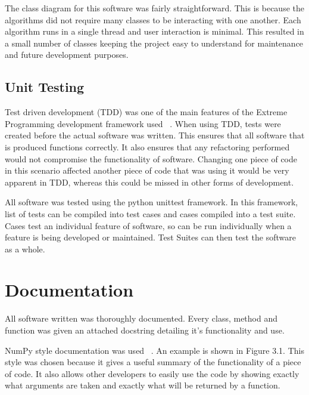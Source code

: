 \documentclass{UoYCSproject}
\begin{document}
The class diagram for this software was fairly straightforward. This is because the algorithms did not require many classes to be interacting with one another. Each algorithm runs in a single thread and user interaction is minimal. This resulted in a small number of classes keeping the project easy to understand for maintenance and future development purposes.
 
\subsection{Unit Testing}
Test driven development (TDD) was one of the main features of the Extreme Programming development framework used  ~\parencite{janzen2005test}. When using TDD, tests were created before the actual software was written. This ensures that all software that is produced functions correctly. It also ensures that any refactoring performed would not compromise the functionality of software. Changing one piece of code in this scenario affected another piece of code that was using it would be very apparent in TDD, whereas this could be missed in other forms of development.

All software was tested using the python unittest framework. In this framework, list of tests can be compiled into test cases and cases compiled into a test suite. Cases test an individual feature of software, so can be run individually when a feature is being developed or maintained. Test Suites can then test the software as a whole.

\section{Documentation}
All software written was thoroughly documented. Every class, method and function was given an attached docstring detailing it's functionality and use.

NumPy style documentation was used ~\parencite{Numpy}. An example is shown in Figure 3.1. This style was chosen because it gives a useful summary of the functionality of a piece of code. It also allows other developers to easily use the code by showing exactly what arguments are taken and exactly what will be returned by a function.
\end{document}

